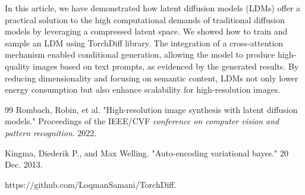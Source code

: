 \documentclass[12pt,twoside]{article}
\begin{document}
In this article, we have demonstrated how latent diffusion models (LDMs) offer a practical solution to the high computational demands of traditional diffusion models by leveraging a compressed latent space. We showed how to train and sample an LDM using TorchDiff library. The integration of a cross-attention mechanism enabled conditional generation, allowing the model to produce high-quality images based on text prompts, as evidenced by the generated results. By reducing dimensionality and focusing on semantic content, LDMs not only lower energy consumption but also enhance scalability for high-resolution images.





\begin{thebibliography}{99}
Rombach, Robin, et al. "High-resolution image synthesis with latent diffusion models." Proceedings of the IEEE/CVF \textit{conference on computer vision and pattern recognition}. 2022.

Kingma, Diederik P., and Max Welling. "Auto-encoding variational bayes." 20 Dec. 2013.

https://github.com/LoqmanSamani/TorchDiff.
\end{thebibliography}
\end{document}

